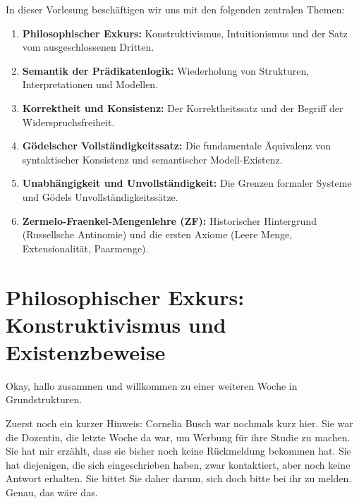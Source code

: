 

\begin{nice-box}
In dieser Vorlesung beschäftigen wir uns mit den folgenden zentralen Themen:
\begin{enumerate}[label=\textbf{(\arabic*)}]
    \item \textbf{Philosophischer Exkurs:} Konstruktivismus, Intuitionismus und der Satz vom ausgeschlossenen Dritten.
    \item \textbf{Semantik der Prädikatenlogik:} Wiederholung von Strukturen, Interpretationen und Modellen.
    \item \textbf{Korrektheit und Konsistenz:} Der Korrektheitssatz und der Begriff der Widerspruchsfreiheit.
    \item \textbf{Gödelscher Vollständigkeitssatz:} Die fundamentale Äquivalenz von syntaktischer Konsistenz und semantischer Modell-Existenz.
    \item \textbf{Unabhängigkeit und Unvollständigkeit:} Die Grenzen formaler Systeme und Gödels Unvollständigkeitssätze.
    \item \textbf{Zermelo-Fraenkel-Mengenlehre (ZF):} Historischer Hintergrund (Russellsche Antinomie) und die ersten Axiome (Leere Menge, Extensionalität, Paarmenge).
\end{enumerate}
\end{nice-box}

\section{Philosophischer Exkurs: Konstruktivismus und Existenzbeweise}

\begin{spoken-clean}[00:00:00 - 00:00:39]
Okay, hallo zusammen und willkommen zu einer weiteren Woche in Grundstrukturen.

Zuerst noch ein kurzer Hinweis: Cornelia Busch war nochmals kurz hier. Sie war die Dozentin, die letzte Woche da war, um Werbung für ihre Studie zu machen. Sie hat mir erzählt, dass sie bisher noch keine Rückmeldung bekommen hat. Sie hat diejenigen, die sich eingeschrieben haben, zwar kontaktiert, aber noch keine Antwort erhalten. Sie bittet Sie daher darum, sich doch bitte bei ihr zu melden. Genau, das wäre das.
\end{spoken-clean}

